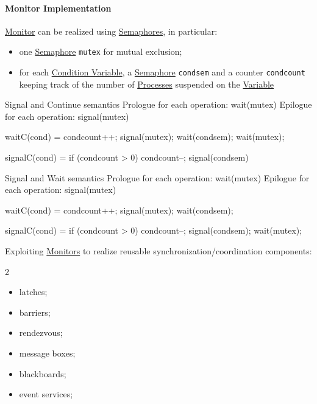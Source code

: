 \paragraph{Monitor Implementation}\label{par:pi_resalloc_monitor_implementation} %
\hyperref[def:monitor]{Monitor} can be realized using \hyperref[def:semaphore]{Semaphores}, in particular:
\begin{itemize}
    \item one \hyperref[def:semaphore]{Semaphore} \texttt{mutex} for mutual exclusion;
    \item for each \hyperref[def:cond-vars]{Condition Variable}, a \hyperref[def:semaphore]{Semaphore} \texttt{condsem} and a counter \texttt{condcount} keeping track of the number of \hyperref[def:process]{Processes} suspended on the \hyperref[def:cond-vars]{Variable} 
\end{itemize}
\begin{codeblock}{Signal and Continue semantics}
    Prologue for each operation:
        wait(mutex)
    Epilogue for each operation:
        signal(mutex)

    waitC(cond) =
        condcount++;
        signal(mutex);
        wait(condsem);
        wait(mutex);

    signalC(cond) =
        if (condcount > 0){
            condcount--;
            signal(condsem)
        }
\end{codeblock}
\begin{codeblock}{Signal and Wait semantics}
    Prologue for each operation:
        wait(mutex)
    Epilogue for each operation:
        signal(mutex)

    waitC(cond) =
        condcount++;
        signal(mutex);
        wait(condsem);

    signalC(cond) =
        if (condcount > 0){
            condcount--;
            signal(condsem);
            wait(mutex);
        }
\end{codeblock}
\begin{note}
    Exploiting \hyperref[def:monitor]{Monitors} to realize reusable synchronization/coordination components:
    \begin{multicols}{2}
        \begin{itemize}
            \item latches;
            \item barriers;
            \item rendezvous;
            \item message boxes;
            \item blackboards;
            \item event services;
        \end{itemize}
    \end{multicols}
\end{note}
